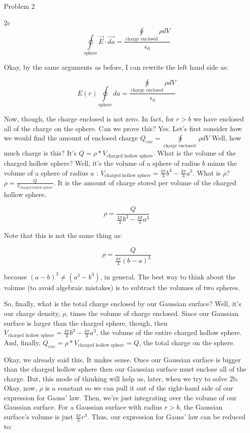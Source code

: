 \begin{homeworkProblem}{Problem 2}
\begin{homeworkSection}{2c}
        \[
            \oint\limits_{\text{sphere}} \vec{E}\cdot\vec{da} =
            \frac{\oint\limits_{\text{charge enclosed}}\rho dV}{\epsilon_0}
        \]

        Okay, by the same arguments as before, I can rewrite the left
        hand side as:

        \[
            E(r)\oint\limits_{\text{sphere}} da =
            \frac{\oint\limits_{\text{charge enclosed}}\rho dV}{\epsilon_0}
        \]

        Now, though, the charge enclosed is not zero. In fact, for $r>b$
        we have enclosed all of the charge on the sphere. Can we prove
        this? Yes. Let's first consider how we would find the amount of
        enclosed charge $Q_{enc} = \oint\limits_{\text{charge enclosed
        }}\rho dV$ Well, how much charge is this? It's
        $Q = \rho * V_{\text{charged hollow sphere}}$.        What is
        the volume of the charged hollow sphere? Well, it's the volume
        of a sphere of radius $b$ minus the volume of a sphere of radius
        $a$ : $V_{\text{charged hollow sphere}} = \frac{4\pi}{3}b^3 -
        \frac{4\pi}{3}a^3$. What is $\rho$? $\rho =
        \frac{Q}{V_{\text{charged hollow sphere}}}$. It is the amount of
        charge stored per volume of the charged hollow sphere.
    
        \[
        \rho = \frac{Q}{\frac{4\pi}{3}b^3 - \frac{4\pi}{3}a^3}
        \]

        Note that this is not the same thing as:
       
        \[ \rho = \frac{Q}{\frac{4\pi}{3}(b - a)^3} \]
        
        because $(a-b)^3 \ne (a^3-b^3)$, in general. The best way to
        think about the volume (to avoid algebraic mistakes) is to
        subtract the volumes of two spheres.

        So, finally, what is the total charge enclosed by our Gaussian
        surface? Well, it's our charge density, $\rho$, times the volume
        of charge enclosed. Since our Gaussian surface is larger than
        the charged sphere, though, then $V_{\text{charged hollow
        sphere}} = \frac{4\pi}{3}b^3 - \frac{4\pi}{3}a^3$, the volume of
        the entire charged hollow sphere. And, finally, $Q_{enc} =
        \rho*V_{\text{charged hollow sphere}} = Q$, the total charge on the
        sphere.

        Okay, we already said this. It makes sense. Once our Gaussian
        surface is bigger than the charged hollow sphere then our
        Gaussian surface must enclose all of the charge. But, this mode
        of thinking will help us, later, when we try to solve 2b. Okay,
        now, $\rho$ is a constant so we can pull it out of the
        right-hand side of our expression for Gauss' law. Then, we're
        just integrating over the volume of our Gaussian surface. For a
        Gaussian surface with radius $r>b$, the Gaussian surface's
        volume is just $\frac{4\pi}{3} r^3$. Thus, our expression for
        Gauss' law can be reduced to:


\end{homeworkSection}
\end{homeworkProblem}
